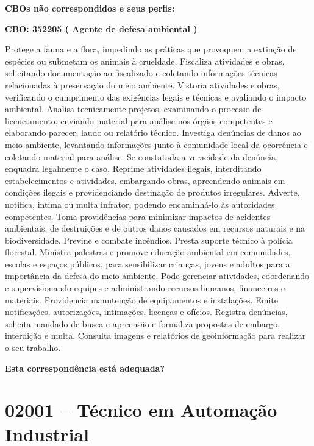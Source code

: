 \documentclass[
]{article}
\begin{document}
\textbf{CBOs não correspondidos e seus perfis:}

\textbf{CBO: 352205  ( Agente de defesa ambiental )}

Protege a fauna e a flora, impedindo as práticas que provoquem a
extinção de espécies ou submetam os animais à crueldade. Fiscaliza
atividades e obras, solicitando documentação ao fiscalizado e coletando
informações técnicas relacionadas à preservação do meio ambiente.
Vistoria atividades e obras, verificando o cumprimento das exigências
legais e técnicas e avaliando o impacto ambiental. Analisa tecnicamente
projetos, examinando o processo de licenciamento, enviando material para
análise nos órgãos competentes e elaborando parecer, laudo ou relatório
técnico. Investiga denúncias de danos ao meio ambiente, levantando
informações junto à comunidade local da ocorrência e coletando material
para análise. Se constatada a veracidade da denúncia, enquadra
legalmente o caso. Reprime atividades ilegais, interditando
estabelecimentos e atividades, embargando obras, apreendendo animais em
condições ilegais e providenciando destinação de produtos irregulares.
Adverte, notifica, intima ou multa infrator, podendo encaminhá-lo às
autoridades competentes. Toma providências para minimizar impactos de
acidentes ambientais, de destruições e de outros danos causados em
recursos naturais e na biodiversidade. Previne e combate incêndios.
Presta suporte técnico à polícia florestal. Ministra palestras e promove
educação ambiental em comunidades, escolas e espaços públicos, para
sensibilizar crianças, jovens e adultos para a importância da defesa do
meio ambiente. Pode gerenciar atividades, coordenando e supervisionando
equipes e administrando recursos humanos, financeiros e materiais.
Providencia manutenção de equipamentos e instalações. Emite
notificações, autorizações, intimações, licenças e ofícios. Registra
denúncias, solicita mandado de busca e apreensão e formaliza propostas
de embargo, interdição e multa. Consulta imagens e relatórios de
geoinformação para realizar o seu trabalho.

\begin{Form}
\textbf{Esta correspondência está adequada?} \\ 
\end{Form}

\newpage
\section{ 02001 -- Técnico em Automação Industrial }
\end{document}
